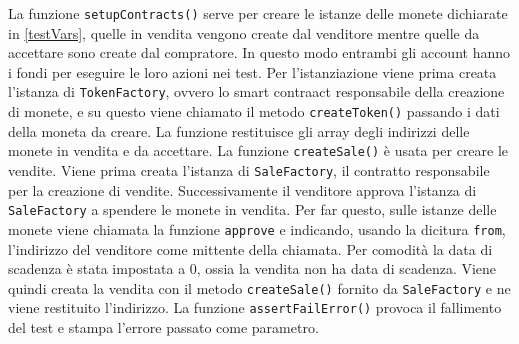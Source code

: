 \documentclass[a4paper]{article}
\begin{document}
        La funzione \verb|setupContracts()| serve per creare le istanze delle monete dichiarate in \ref{testVars}, quelle in vendita vengono create dal venditore mentre quelle da accettare sono create dal compratore.
        In questo modo entrambi gli account hanno i fondi per eseguire le loro azioni nei test. Per l'istanziazione viene prima creata l'istanza di \verb|TokenFactory|, ovvero lo smart contraact responsabile della creazione di monete,
        e su questo viene chiamato il metodo \verb|createToken()| passando i dati della moneta da creare. La funzione restituisce gli array degli indirizzi delle monete in vendita e da accettare.
        \newline
        La funzione \verb|createSale()| è usata per creare le vendite. Viene prima creata l'istanza di \verb|SaleFactory|, il contratto responsabile per la creazione di vendite. Successivamente il venditore approva l'istanza di \verb|SaleFactory| a spendere le monete in vendita.
        Per far questo, sulle istanze delle monete viene chiamata la funzione \verb|approve| e indicando, usando la dicitura \verb|from|, l'indirizzo del venditore come mittente della chiamata. Per comodità la data di scadenza è stata impostata a 0, ossia la vendita non ha data di scadenza.
        Viene quindi creata la vendita con il metodo \verb|createSale()| fornito da \verb|SaleFactory| e ne viene restituito l'indirizzo.
        \newline
        La funzione \verb|assertFailError()| provoca il fallimento del test e stampa l'errore passato come parametro.
\end{document}
